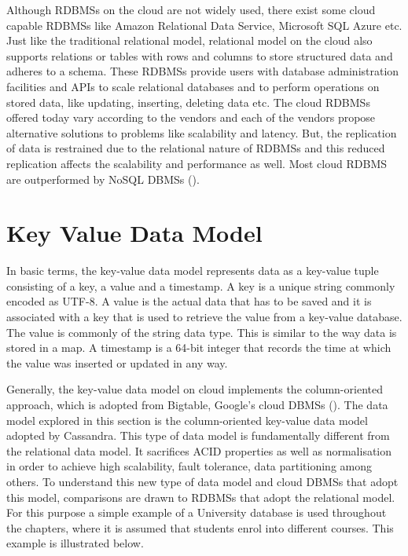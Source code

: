 Although \acp{RDBMS} on the cloud are not widely used,   there exist some cloud
capable \acp{RDBMS} like Amazon Relational Data Service,   Microsoft SQL Azure
etc.  Just like the traditional relational model,   relational model on the cloud
also supports relations or tables with rows and columns to store structured data
and adheres to a schema.  These \acp{RDBMS} provide users with database
administration facilities and APIs to scale relational databases and to perform
operations on stored data,   like updating,   inserting,   deleting data etc.  The
cloud \acp{RDBMS} offered today vary according to the vendors and each of the vendors
propose alternative solutions to problems like scalability and latency.  But,   the
replication of data is restrained due to the relational nature of \acp{RDBMS} and this reduced
replication affects the scalability and performance as well.  Most cloud
\ac{RDBMS} are outperformed by \ac{NoSQL} \acp{DBMS} (). 

\section{Key Value Data Model}\label{s:key-value-data-model}
In basic terms,   the key-value data model represents data as a key-value tuple
consisting of a key,   a value and a timestamp.  A key is a unique string commonly
encoded as UTF-8.  A value is the actual data that has to be saved and it is
associated with a key that is used to retrieve the value from a key-value
database.  The value is commonly of the string data type. 
This is similar to the way data is stored in a map.  A timestamp is a 64-bit
integer that records the time at which the value was inserted or updated in
any way. 

Generally,   the key-value data model on cloud implements the column-oriented
approach,   which is adopted from Bigtable,   Google's cloud \acp{DBMS} ().  The data model explored in this section is the column-oriented key-value
data model adopted by Cassandra.  This type of data model is fundamentally
different from the relational data model.  It sacrifices ACID properties as well
as normalisation in order to achieve high scalability,   fault tolerance,   data
partitioning among others.  To understand this new type of data model and cloud
\acp{DBMS} that adopt this model,   comparisons are drawn to \acp{RDBMS} that
adopt the relational model.  For this purpose a simple
example of a University database is used throughout the chapters,   where it
is assumed that students enrol into different courses.  This example is
illustrated below. 

